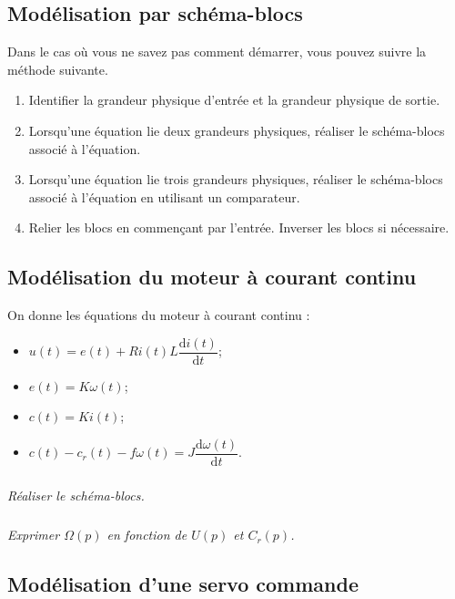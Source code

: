 \documentclass[10pt,fleqn]{article} %
\begin{document}

\vspace{6cm}
\pagestyle{fancy}
\thispagestyle{plain}

\def\columnseprulecolor{\color{ocre}}
\setlength{\columnseprule}{0.4pt} 


\begin{multicols}{2}
\section*{Modélisation par schéma-blocs}

\begin{methode}
Dans le cas où vous ne savez pas comment démarrer, vous pouvez suivre la méthode suivante.
\begin{enumerate}
\item Identifier la grandeur physique d'entrée et la grandeur physique de sortie.
\item Lorsqu'une équation lie deux grandeurs physiques, réaliser le schéma-blocs associé à l'équation. 
\item Lorsqu'une équation lie trois grandeurs physiques, réaliser le schéma-blocs associé à l'équation en utilisant un comparateur.
\item Relier les blocs en commençant par l'entrée. Inverser les blocs si nécessaire.
\end{enumerate}
\end{methode}
\subsection*{Modélisation du moteur à courant continu}
On donne les équations du moteur à courant continu :
\begin{itemize}
\item $u(t) = e(t)+ Ri(t) L \dfrac{\text{d}i(t)}{\text{d} t}$;
\item $e(t)=K\omega(t)$;
\item $c(t)=Ki(t)$;
\item $c(t)-c_r(t) - f\omega(t)=J\dfrac{\text{d}\omega(t)}{\text{d} t}$.
\end{itemize}
\subparagraph{}
\textit{Réaliser le schéma-blocs.}

\subparagraph{}
\textit{Exprimer $\Omega(p)$ en fonction de $U(p)$ et $C_r(p)$.}

\subsection*{Modélisation d'une servo commande}


\end{multicols}
\end{document}
